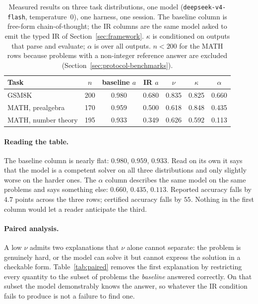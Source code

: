 \documentclass[11pt,a4paper]{article}
\begin{document}
\begin{table}[t]
\centering
\caption{Measured results on three task distributions, one model
(\texttt{deepseek-v4-flash}, temperature~0), one harness, one session.  The
baseline column is free-form chain-of-thought; the IR columns are the same model
asked to emit the typed IR of Section~\ref{sec:framework}.  $\kappa$ is
conditioned on outputs that parse and evaluate; $\alpha$ is over all outputs.
$n < 200$ for the MATH rows because problems with a non-integer reference answer
are excluded (Section~\ref{sec:protocol-benchmarks}).}
\label{tab:results}
\begin{tabular}{@{}lcccccc@{}}
\toprule
Task & $n$ & baseline $a$ & IR $a$ & $\nu$ & $\kappa$ & $\alpha$ \\
\midrule
GSM8K                    & 200 & 0.980 & 0.680 & 0.835 & 0.825 & 0.660 \\
MATH, prealgebra         & 170 & 0.959 & 0.500 & 0.618 & 0.848 & 0.435 \\
MATH, number theory      & 195 & 0.933 & 0.349 & 0.626 & 0.592 & 0.113 \\
\bottomrule
\end{tabular}
\end{table}

\paragraph{Reading the table.}
The baseline column is nearly flat: $0.980$, $0.959$, $0.933$.  Read on its own
it says that the model is a competent solver on all three distributions and only
slightly worse on the harder ones.  The $\alpha$ column describes the same model
on the same problems and says something else: $0.660$, $0.435$, $0.113$.
Reported accuracy falls by $4.7$ points across the three rows; certified accuracy
falls by $55$.  Nothing in the first column would let a reader anticipate the
third.

\paragraph{Paired analysis.}
A low $\nu$ admits two explanations that $\nu$ alone cannot separate: the problem
is genuinely hard, or the model can solve it but cannot express the solution in a
checkable form.  Table~\ref{tab:paired} removes the first explanation by
restricting every quantity to the subset of problems the \emph{baseline}
answered correctly.  On that subset the model demonstrably knows the answer, so
whatever the IR condition fails to produce is not a failure to find one.
\end{document}
